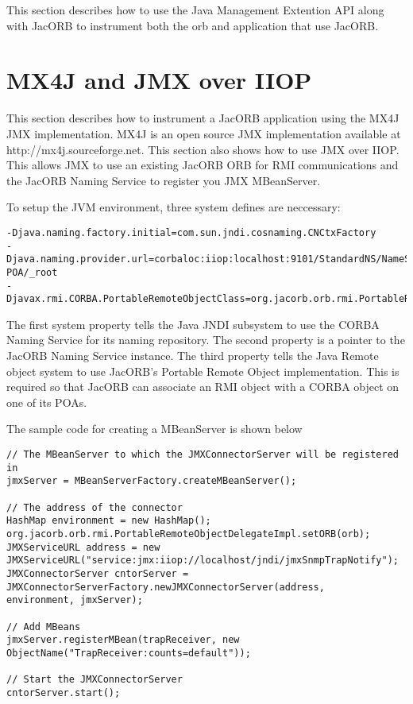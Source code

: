 
This section describes how to use the Java Management Extention API along with JacORB to
instrument both the orb and application that use JacORB.

\section{MX4J and JMX over IIOP}

This section describes how to instrument a JacORB application using the MX4J JMX implementation.
MX4J is an open source JMX implementation available at http://mx4j.sourceforge.net. This section
also shows how to use JMX over IIOP. This allows JMX to use an existing JacORB ORB for RMI
communications and the JacORB Naming Service to register you JMX MBeanServer.

To setup the JVM environment, three system defines are neccessary:

\begin{scriptsize}
\begin{verbatim}
-Djava.naming.factory.initial=com.sun.jndi.cosnaming.CNCtxFactory
-Djava.naming.provider.url=corbaloc:iiop:localhost:9101/StandardNS/NameServer-POA/_root
-Djavax.rmi.CORBA.PortableRemoteObjectClass=org.jacorb.orb.rmi.PortableRemoteObjectDelegateImpl
\end{verbatim}
\end{scriptsize}

The first system property tells the Java JNDI subsystem to use the CORBA Naming Service for its
naming repository. The second property is a pointer to the JacORB Naming Service instance. The
third property tells the Java Remote object system to use JacORB's Portable Remote Object implementation. This is required so that JacORB can associate an RMI object with a CORBA object on one of its POAs.

The sample code for creating a MBeanServer is shown below

\begin{scriptsize}
\begin{verbatim}
// The MBeanServer to which the JMXConnectorServer will be registered in
jmxServer = MBeanServerFactory.createMBeanServer();

// The address of the connector
HashMap environment = new HashMap();
org.jacorb.orb.rmi.PortableRemoteObjectDelegateImpl.setORB(orb);
JMXServiceURL address = new JMXServiceURL("service:jmx:iiop://localhost/jndi/jmxSnmpTrapNotify");
JMXConnectorServer cntorServer = JMXConnectorServerFactory.newJMXConnectorServer(address,                                             environment, jmxServer);

// Add MBeans
jmxServer.registerMBean(trapReceiver, new ObjectName("TrapReceiver:counts=default"));

// Start the JMXConnectorServer
cntorServer.start();
\end{verbatim}
\end{scriptsize}

